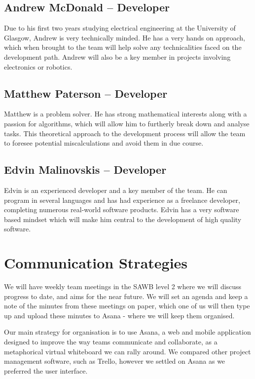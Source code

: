 \documentclass[preprint,12pt]{elsarticle}
\begin{document}
\subsection*{Andrew McDonald -- Developer}
\noindent Due to his first two years studying electrical engineering at the University of
Glasgow, Andrew is very technically minded. He has a very hands on approach,
which when brought to the team will help solve any technicalities faced on the
development path. Andrew will also be a key member in projects involving
electronics or robotics.

\subsection*{Matthew Paterson -- Developer}
\noindent Matthew is a problem solver. He has strong mathematical interests along with a
passion for algorithms, which will allow him to furtherly break down and
analyse tasks. This theoretical approach to the development process will allow
the team to foresee potential miscalculations and avoid them in due course. 

\subsection*{Edvin Malinovskis -- Developer}
\noindent Edvin is an experienced developer and a key member of the team. He can program
in several languages and has had experience as a freelance developer,
completing numerous real-world software products. Edvin has a very software
based mindset which will make him central to the development of high quality
software. 

\section{Communication Strategies}
\noindent We will have weekly team meetings in the SAWB level 2 where we will discuss progress to date, and aims for the near future. We will set an agenda and keep a note of the minutes from these meetings on paper, which one of us will then type up and upload these minutes to Asana - where we will keep them organised. 

\noindent Our main strategy for organisation is to use Asana, a web and mobile
application designed to improve the way teams communicate and collaborate, as a
metaphorical virtual whiteboard we can rally around. We compared other project
management software, such as Trello, however we settled on Asana as we
preferred the user interface.
\end{document}

